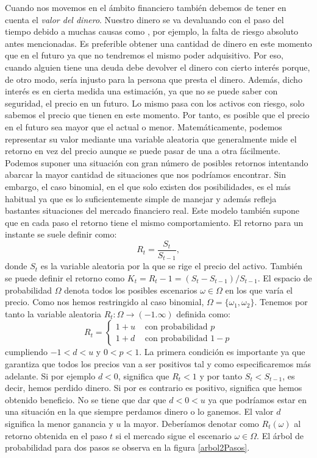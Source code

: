 Cuando nos movemos en el ámbito financiero también debemos de tener en cuenta el \textit{valor del dinero}. Nuestro dinero se va devaluando con el paso del tiempo debido a muchas causas como , por ejemplo, la falta de riesgo absoluto antes mencionadas. Es preferible obtener una cantidad de dinero en este momento que en el futuro ya que no tendremos el mismo poder adquisitivo. Por eso, cuando alguien tiene una deuda debe devolver el dinero con cierto interés porque, de otro modo, sería injusto para la persona que presta el dinero. Además, dicho interés es en cierta medida una estimación, ya que no se puede saber con seguridad, el precio en un futuro. Lo mismo pasa con los activos con riesgo, solo sabemos el precio que tienen en este momento. Por tanto, es posible que el precio en el futuro sea mayor que el actual o menor. Matemáticamente, podemos representar su valor mediante una variable aleatoria que generalmente mide el retorno en vez del precio aunque se puede pasar de una a otra fácilmente. Podemos suponer una situación con gran número de posibles retornos intentando abarcar la mayor cantidad de situaciones que nos podríamos encontrar. Sin embargo, el caso binomial, en el que solo existen dos posibilidades, es el más habitual ya que es lo suficientemente simple de manejar y además refleja bastantes situaciones del mercado financiero real. Este modelo también supone que en cada paso el retorno tiene el mismo comportamiento. El retorno para un instante se suele definir como:
\[
R_t = \frac{S_t}{S_{t-1}},
\]
donde $ S_t $ es la variable aleatoria por la que se rige el precio del activo. También se puede definir el retorno como $ K_t = R_t - 1 = (S_t-S_{t-1})/S_{t-1}$. El espacio de probabilidad $ \Omega $ denota todos los posibles escenarios $ \omega \in \Omega $ en los que varía el precio. Como nos hemos restringido al caso binomial, $ \Omega = \{ \omega_1, \omega_2\} $. Tenemos por tanto la variable aleatoria $ R_t:\Omega \longrightarrow (-1.\infty) $ definida como:
\[
R_t = \begin{cases}
1+ u & \text{ con probabilidad } p\\
1+ d & \text{ con probabilidad } 1-p
\end{cases}
\]
cumpliendo $ -1 < d < u $ y $ 0 < p <1 $. La primera condición es importante ya que garantiza que todos los precios van a ser positivos tal y como especificaremos más adelante. Si por ejemplo $ d < 0 $, significa que $ R_t < 1 $ y por tanto $ S_t < S_{t-1} $, es decir, hemos perdido dinero. Si por es contrario es positivo, significa que hemos obtenido beneficio. No se tiene que dar que $ d < 0 < u$ ya que podríamos estar en una situación en la que siempre perdamos dinero o lo ganemos. El valor $ d $ significa la menor ganancia y $ u $ la mayor. Deberíamos denotar como $ R_t(\omega) $ al retorno obtenida en el paso $ t $ si el mercado sigue el escenario $ \omega \in \Omega $. El árbol de probabilidad para dos pasos se observa en la figura \ref{arbol2Pasos}.

